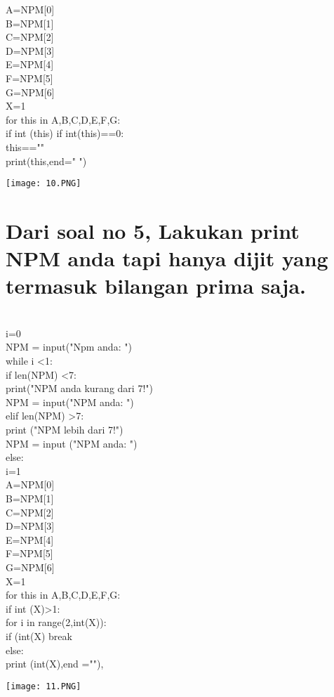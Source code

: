\documentclass{article}
\begin{document}
A=NPM[0]\\
B=NPM[1]\\
C=NPM[2]\\
D=NPM[3]\\
E=NPM[4]\\
F=NPM[5]\\
G=NPM[6]\\

X=1\\

for this in A,B,C,D,E,F,G:\\
    
    if int (this)%
        if int(this)==0:\\
            this==""\\
        print(this,end=" ")\\
\begin{center}
    \texttt{[image: 10.PNG]}
\end{center}

\section{Dari soal no 5, Lakukan print NPM anda tapi hanya dijit yang termasuk bilangan prima saja.}\\
i=0\\
NPM = input("Npm anda: ")\\
while i <1:\\
    if len(NPM) <7:\\
        print("NPM anda kurang dari 7!")\\
        NPM = input("NPM anda: ")\\
    elif len(NPM) >7:\\
        print ("NPM lebih dari 7!")\\
        NPM = input ("NPM anda: ")\\
    else:\\
        i=1\\

A=NPM[0]\\
B=NPM[1]\\
C=NPM[2]\\
D=NPM[3]\\
E=NPM[4]\\
F=NPM[5]\\
G=NPM[6]\\

X=1\\

for this in A,B,C,D,E,F,G:\\
    
    if int (X)>1:\\
        for i in range(2,int(X)):\\
            if (int(X)%
                break\\
        else:\\
            print (int(X),end =""),\\
\begin{center}
    \texttt{[image: 11.PNG]}
\end{center}
\end{document}
